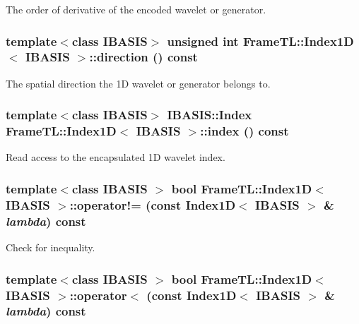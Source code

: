 The order of derivative of the encoded wavelet or generator. \hypertarget{classFrameTL_1_1Index1D_6b15c805cffc08a4c241b6343573fe0a}{
\subsubsection[{direction}]{\setlength{\rightskip}{0pt plus 5cm}template$<$class IBASIS$>$ unsigned int {\bf FrameTL::Index1D}$<$ IBASIS $>$::direction () const}}
\label{classFrameTL_1_1Index1D_6b15c805cffc08a4c241b6343573fe0a}


The spatial direction the 1D wavelet or generator belongs to. \hypertarget{classFrameTL_1_1Index1D_c7730cfbad3d3f89e1a22f7f6b8ee6b9}{
\subsubsection[{index}]{\setlength{\rightskip}{0pt plus 5cm}template$<$class IBASIS$>$ IBASIS::Index {\bf FrameTL::Index1D}$<$ IBASIS $>$::index () const}}
\label{classFrameTL_1_1Index1D_c7730cfbad3d3f89e1a22f7f6b8ee6b9}


Read access to the encapsulated 1D wavelet index. \hypertarget{classFrameTL_1_1Index1D_a966fed809d2871b7cec4eadeffb6814}{
\subsubsection[{operator!=}]{\setlength{\rightskip}{0pt plus 5cm}template$<$class IBASIS $>$ bool {\bf FrameTL::Index1D}$<$ IBASIS $>$::operator!= (const {\bf Index1D}$<$ IBASIS $>$ \& {\em lambda}) const}}
\label{classFrameTL_1_1Index1D_a966fed809d2871b7cec4eadeffb6814}


Check for inequality. \hypertarget{classFrameTL_1_1Index1D_276b4f8c960e7bce5cac8d63c5c07bad}{
\subsubsection[{operator$<$}]{\setlength{\rightskip}{0pt plus 5cm}template$<$class IBASIS $>$ bool {\bf FrameTL::Index1D}$<$ IBASIS $>$::operator$<$ (const {\bf Index1D}$<$ IBASIS $>$ \& {\em lambda}) const}}
\label{classFrameTL_1_1Index1D_276b4f8c960e7bce5cac8d63c5c07bad}


